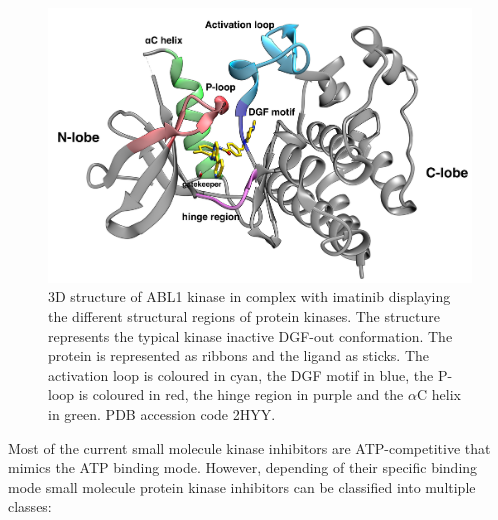 \documentclass[12pt, b5paper,twoside]{tesi_upf}
\begin{document}
 \begin{figure}[htbp]
  
  \centering
    
   
	\includegraphics[width=1\linewidth]{../figures/kinase_structure.png}
	\caption[Schematic representation of the different structural regions of protein kinases]{3D structure of ABL1 kinase in complex with imatinib displaying the different structural regions of protein kinases. The structure represents the typical kinase inactive DGF-out conformation. The protein is represented as ribbons and the ligand as sticks. The activation loop is coloured in cyan, the DGF motif in blue, the P-loop is coloured in red, the hinge region in purple and the $\alpha$C helix in green. PDB accession code 2HYY.}
	\label{fig:kinase_general_conformation}
	
\end{figure}
\par Most of the current small molecule kinase inhibitors are ATP-competitive that mimics the ATP binding mode. However, depending of their specific binding mode small molecule protein kinase inhibitors can be classified into multiple classes:
 
\end{document}
